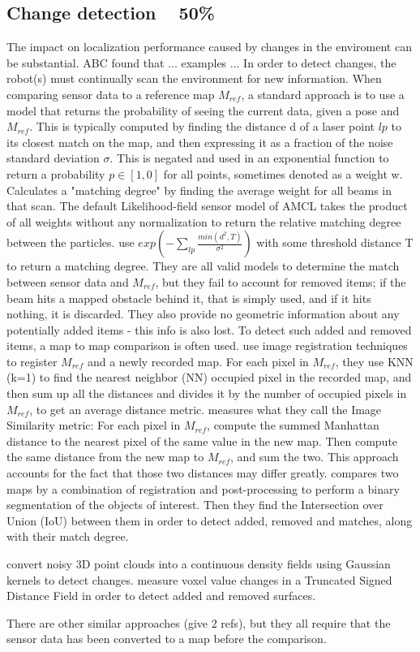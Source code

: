 
\subsection{Change detection ~ 50\%}

The impact on localization performance caused by changes in the enviroment can be substantial. ABC found that ... examples ... In order to detect changes, the robot(s) must
continually scan the environment for new information.
When comparing sensor data to a reference map $M_{ref}$, a standard approach is to use a model that returns the probability of seeing the current data, given a pose and $M_{ref}$.
This is typically computed by finding the distance d of a laser point $lp$ to its closest match on the map, and then expressing it as a fraction of the noise standard deviation $\sigma$.
This is negated and used in an exponential function to return a probability $p \in [1,0]$ for all points, sometimes denoted as a weight w.
\cite{b1} Calculates a "matching degree" by finding the average weight for all beams in that scan. 
The default Likelihood-field sensor model of AMCL \cite{b2} takes the product of all weights without any normalization to return the relative matching degree between the particles. 
\cite{b3} use $exp(-\sum_{lp}\frac{min(d^2,T)}{\sigma^2})$ with some threshold distance T to return a matching degree. They are all valid models to determine the match
between sensor data and $M_{ref}$, but they fail to account for removed items; if the beam hits a mapped obstacle behind it, that is simply used, and if it hits
nothing, it is discarded. They also provide no geometric information about any potentially added items - this info is also lost.
To detect such added and removed items, a map to map comparison is often used. \cite{b4} use image registration techniques to register $M_{ref}$ and a newly recorded map.
For each pixel in $M_{ref}$, they use KNN (k=1) to find the nearest neighbor (NN) occupied pixel in the recorded map,
and then sum up all the distances and divides it by the number of occupied pixels in $M_{ref}$, to get an average distance metric. \cite{b5} measures what they call
the Image Similarity metric: For each pixel in $M_{ref}$, compute the summed Manhattan distance to the nearest pixel of the same value in the new map. 
Then compute the same distance from the new map to $M_{ref}$, and sum the two. This approach accounts for the fact that those two distances may differ greatly. 
\cite{b6} compares two maps by a combination of registration and post-processing to perform a binary segmentation of the objects of interest. 
Then they find the Intersection over Union (IoU) between them in order to detect added, removed and matches, along with their match degree. 

\cite{b7} convert noisy 3D point clouds into a continuous density fields using Gaussian kernels to detect changes. 
\cite{b8} measure voxel value changes in a Truncated Signed Distance Field in order to detect added and removed surfaces. 

There are other similar approaches (give 2 refs), but they all require that the sensor data has been converted to a map before the comparison.
